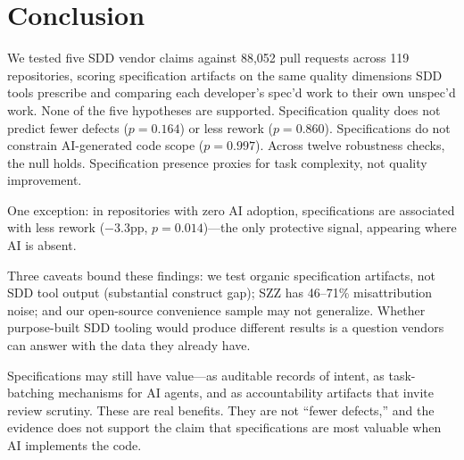 \documentclass[a4paper,UKenglish,cleveref,autoref,thm-restate]{lipics-v2021}
\begin{document}
\section{Conclusion}

We tested five SDD vendor claims against 88,052 pull requests across 119 repositories, scoring specification artifacts on the same quality dimensions SDD tools prescribe and comparing each developer's spec'd work to their own unspec'd work. None of the five hypotheses are supported. Specification quality does not predict fewer defects ($p = 0.164$) or less rework ($p = 0.860$). Specifications do not constrain AI-generated code scope ($p = 0.997$). Across twelve robustness checks, the null holds. Specification presence proxies for task complexity, not quality improvement.

One exception: in repositories with zero AI adoption, specifications are associated with less rework ($-3.3$pp, $p = 0.014$)---the only protective signal, appearing where AI is absent.

Three caveats bound these findings: we test organic specification artifacts, not SDD tool output (substantial construct gap); SZZ has 46--71\% misattribution noise; and our open-source convenience sample may not generalize. Whether purpose-built SDD tooling would produce different results is a question vendors can answer with the data they already have.

Specifications may still have value---as auditable records of intent, as task-batching mechanisms for AI agents, and as accountability artifacts that invite review scrutiny. These are real benefits. They are not ``fewer defects,'' and the evidence does not support the claim that specifications are most valuable when AI implements the code.


\end{document}
